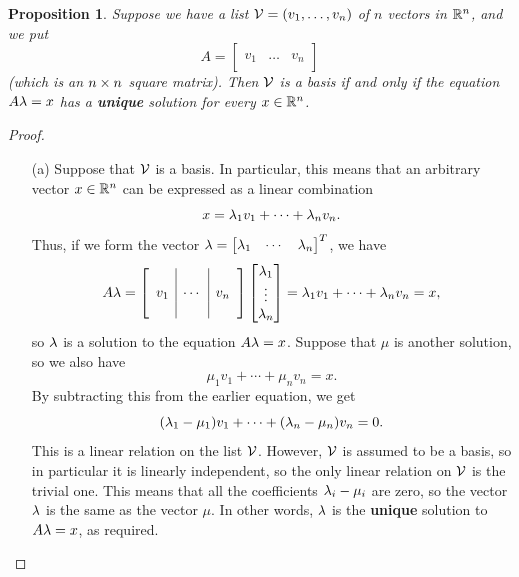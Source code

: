 \documentclass[reqno]{amsart}
\newtheorem{proposition}[theorem]{Proposition}
\theoremstyle{definition}
\begin{document}
\begin{proposition}\label{prop-basis}
 Suppose we have a list $\mathcal{V}=(v_1,\dotsc,v_n)$ of $n$ vectors in
 ${\mathbb{R}}^n$, and we put
 \[ A = \left[\begin{array}{c|c|c}
              && \\
              v_1 & \dotsc & v_n \\
              &&
            \end{array}\right]
 \]
 (which is an $n\times n$ square matrix).  Then $\mathcal{V}$ is a basis if and
 only if the equation $A\lambda=x$ has a \textbf{unique} solution for
 every $x\in{\mathbb{R}}^n$.
\end{proposition}
\begin{proof}
 \begin{itemize}
  \item[(a)]
   Suppose that $\mathcal{V}$ is a basis.  In particular, this means that an
   arbitrary vector $x\in{\mathbb{R}}^n$ can be expressed as a linear combination
   \[ x = \lambda_1v_1 + \dotsb + \lambda_nv_n. \]
   Thus, if we form the vector $\lambda=\left[\begin{matrix} \lambda_1 & \dotsb & \lambda_n\end{matrix}\right]^T$,
   we have
   \[ A\lambda = \left[\begin{array}{c|c|c}
              && \\ v_1 & \cdots & v_n \\ &&
             \end{array}\right]
             \left[\begin{matrix} \lambda_1 \\ \vdots \\ \lambda_n \end{matrix}\right]
       = \lambda_1v_1 + \dotsb + \lambda_nv_n = x,
   \]
   so $\lambda$ is a solution to the equation $A\lambda=x$.  Suppose that $\mu$
   is another solution, so we also have
   \[ \mu_1v_1 + \dotsb + \mu_nv_n = x. \]
   By subtracting this from the earlier equation, we get
   \[ (\lambda_1-\mu_1)v_1 + \dotsb + (\lambda_n-\mu_n)v_n = 0. \]
   This is a linear relation on the list $\mathcal{V}$.  However, $\mathcal{V}$ is
   assumed to be a basis, so in particular it is linearly independent,
   so the only linear relation on $\mathcal{V}$ is the trivial one.  This means
   that all the coefficients $\lambda_i-\mu_i$ are zero, so the vector $\lambda$
   is the same as the vector $\mu$.  In other words, $\lambda$ is the
   \textbf{unique} solution to $A\lambda=x$, as required.


\end{itemize}
\end{proof}
\end{document}

